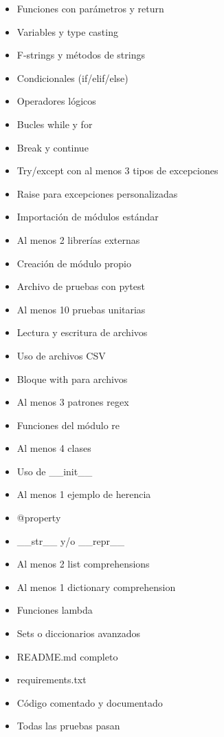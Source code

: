 \documentclass[12pt,a4paper]{article}
\begin{document}
\begin{itemize}
    \item[$\square$] Funciones con parámetros y return
    \item[$\square$] Variables y type casting
    \item[$\square$] F-strings y métodos de strings
    \item[$\square$] Condicionales (if/elif/else)
    \item[$\square$] Operadores lógicos
    \item[$\square$] Bucles while y for
    \item[$\square$] Break y continue
    \item[$\square$] Try/except con al menos 3 tipos de excepciones
    \item[$\square$] Raise para excepciones personalizadas
    \item[$\square$] Importación de módulos estándar
    \item[$\square$] Al menos 2 librerías externas
    \item[$\square$] Creación de módulo propio
    \item[$\square$] Archivo de pruebas con pytest
    \item[$\square$] Al menos 10 pruebas unitarias
    \item[$\square$] Lectura y escritura de archivos
    \item[$\square$] Uso de archivos CSV
    \item[$\square$] Bloque with para archivos
    \item[$\square$] Al menos 3 patrones regex
    \item[$\square$] Funciones del módulo re
    \item[$\square$] Al menos 4 clases
    \item[$\square$] Uso de \_\_init\_\_
    \item[$\square$] Al menos 1 ejemplo de herencia
    \item[$\square$] @property
    \item[$\square$] \_\_str\_\_ y/o \_\_repr\_\_
    \item[$\square$] Al menos 2 list comprehensions
    \item[$\square$] Al menos 1 dictionary comprehension
    \item[$\square$] Funciones lambda
    \item[$\square$] Sets o diccionarios avanzados
    \item[$\square$] README.md completo
    \item[$\square$] requirements.txt
    \item[$\square$] Código comentado y documentado
    \item[$\square$] Todas las pruebas pasan
\end{itemize}
\end{document}
